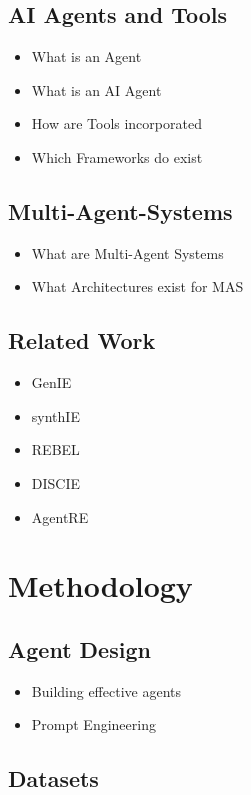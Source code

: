 \documentclass[a4paper,oneside,bibliography=totoc]{scrbook}
\begin{document}
\section{AI Agents and Tools}
\begin{itemize}
  \item What is an Agent
  \item What is an AI Agent
  \item How are Tools incorporated
  \item Which Frameworks do exist
\end{itemize}
\section{Multi-Agent-Systems}
\begin{itemize}
  \item What are Multi-Agent Systems
  \item What Architectures exist for MAS
\end{itemize}
\section{Related Work}
\begin{itemize}
  \item GenIE \cite{Josifoski2021}
  \item synthIE \cite{Josifoski2023}
  \item REBEL \cite{HuguetCabot2021}
  \item DISCIE \cite{Moeller2024}
  \item AgentRE \cite{Shi2024}
\end{itemize}


\chapter{Methodology}
\section{Agent Design}
\begin{itemize}
  \item Building effective agents \cite{Anthropic2024}
  \item Prompt Engineering \cite{Schulhoff2025}
\end{itemize}
\section{Datasets}
\end{document}
